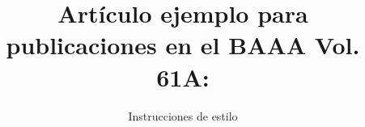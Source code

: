 \documentclass[baaa]{baaa}
\begin{document}



\title{Artículo ejemplo para publicaciones en el BAAA Vol. 61A:}
\subtitle{Instrucciones de estilo}

\end{document}
